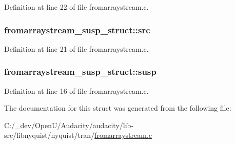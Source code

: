 Definition at line 22 of file fromarraystream.\+c.

\subsubsection[{\texorpdfstring{src}{src}}]{ fromarraystream\+\_\+susp\+\_\+struct\+::src}\hypertarget{structfromarraystream__susp__struct_a935dedff401014457512fa8707c95e0a}{}\label{structfromarraystream__susp__struct_a935dedff401014457512fa8707c95e0a}


Definition at line 21 of file fromarraystream.\+c.

\subsubsection[{\texorpdfstring{susp}{susp}}]{ fromarraystream\+\_\+susp\+\_\+struct\+::susp}\hypertarget{structfromarraystream__susp__struct_afa85d903f74b25087098cd156851b1fd}{}\label{structfromarraystream__susp__struct_afa85d903f74b25087098cd156851b1fd}


Definition at line 16 of file fromarraystream.\+c.



The documentation for this struct was generated from the following file\+:\begin{DoxyCompactItemize}
\item 
C\+:/\+\_\+dev/\+Open\+U/\+Audacity/audacity/lib-\/src/libnyquist/nyquist/tran/\hyperlink{fromarraystream_8c}{fromarraystream.\+c}\end{DoxyCompactItemize}
